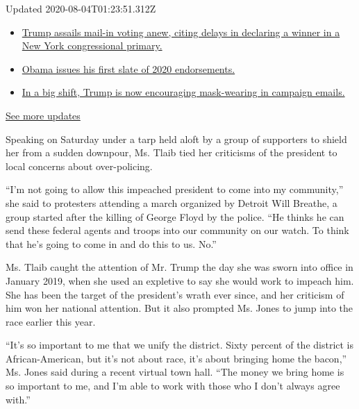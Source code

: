 Updated 2020-08-04T01:23:51.312Z

\begin{itemize}
\tightlist
\item
  \href{https://www.nytimes.com/2020/08/03/us/elections/biden-vs-trump.html?action=click\&pgtype=Article\&state=default\&region=MAIN_CONTENT_1\&context=storylines_live_updates\#link-6494b448}{Trump
  assails mail-in voting anew, citing delays in declaring a winner in a
  New York congressional primary.}
\item
  \href{https://www.nytimes.com/2020/08/03/us/elections/biden-vs-trump.html?action=click\&pgtype=Article\&state=default\&region=MAIN_CONTENT_1\&context=storylines_live_updates\#link-3de249e6}{Obama
  issues his first slate of 2020 endorsements.}
\item
  \href{https://www.nytimes.com/2020/08/03/us/elections/biden-vs-trump.html?action=click\&pgtype=Article\&state=default\&region=MAIN_CONTENT_1\&context=storylines_live_updates\#link-54e34d20}{In
  a big shift, Trump is now encouraging mask-wearing in campaign
  emails.}
\end{itemize}

\href{https://www.nytimes.com/2020/08/03/us/elections/biden-vs-trump.html?action=click\&pgtype=Article\&state=default\&region=MAIN_CONTENT_1\&context=storylines_live_updates}{See
more updates}

Speaking on Saturday under a tarp held aloft by a group of supporters to
shield her from a sudden downpour, Ms. Tlaib tied her criticisms of the
president to local concerns about over-policing.

``I'm not going to allow this impeached president to come into my
community,'' she said to protesters attending a march organized by
Detroit Will Breathe, a group started after the killing of George Floyd
by the police. ``He thinks he can send these federal agents and troops
into our community on our watch. To think that he's going to come in and
do this to us. No.''

Ms. Tlaib caught the attention of Mr. Trump the day she was sworn into
office in January 2019, when she used an expletive to say she would work
to impeach him. She has been the target of the president's wrath ever
since, and her criticism of him won her national attention. But it also
prompted Ms. Jones to jump into the race earlier this year.

``It's so important to me that we unify the district. Sixty percent of
the district is African-American, but it's not about race, it's about
bringing home the bacon,'' Ms. Jones said during a recent virtual town
hall. ``The money we bring home is so important to me, and I'm able to
work with those who I don't always agree with.''


